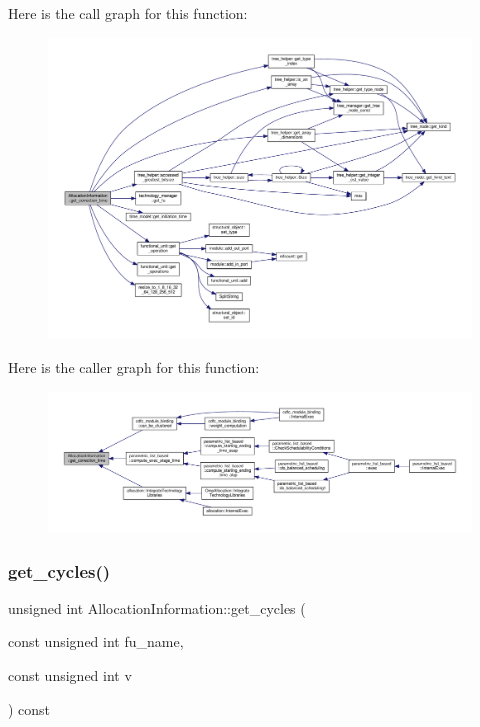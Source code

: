 Here is the call graph for this function\+:
\nopagebreak
\begin{figure}[H]
\begin{center}
\leavevmode
\includegraphics[width=350pt]{d7/d79/classAllocationInformation_aac434b4b44cb2d6a383f8a23927f68da_cgraph}
\end{center}
\end{figure}
Here is the caller graph for this function\+:
\nopagebreak
\begin{figure}[H]
\begin{center}
\leavevmode
\includegraphics[width=350pt]{d7/d79/classAllocationInformation_aac434b4b44cb2d6a383f8a23927f68da_icgraph}
\end{center}
\end{figure}
\mbox{\label{classAllocationInformation_a2ca79a1058c4e5a05ce0cd409a35e561}} 
\subsubsection{\texorpdfstring{get\+\_\+cycles()}{get\_cycles()}\hspace{0.1cm}{\footnotesize\ttfamily [1/2]}}
{\footnotesize\ttfamily unsigned int Allocation\+Information\+::get\+\_\+cycles (\begin{DoxyParamCaption}\item[{const unsigned int}]{fu\+\_\+name,  }\item[{const unsigned int}]{v }\end{DoxyParamCaption}) const}




